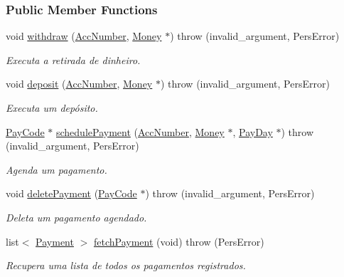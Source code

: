 \subsubsection*{Public Member Functions}
\begin{DoxyCompactItemize}
\item 
void \hyperlink{classStubTransacAdm_aa411e937e159c26aa50901aad504db42}{withdraw} (\hyperlink{classAccNumber}{Acc\-Number}, \hyperlink{classMoney}{Money} $\ast$)  throw (invalid\-\_\-argument, Pers\-Error)
\begin{DoxyCompactList}\small\item\em Executa a retirada de dinheiro. \end{DoxyCompactList}\item 
void \hyperlink{classStubTransacAdm_afc25824382e5ce8cd491a573b557bbc1}{deposit} (\hyperlink{classAccNumber}{Acc\-Number}, \hyperlink{classMoney}{Money} $\ast$)  throw (invalid\-\_\-argument, Pers\-Error)
\begin{DoxyCompactList}\small\item\em Executa um depósito. \end{DoxyCompactList}\item 
\hyperlink{classPayCode}{Pay\-Code} $\ast$ \hyperlink{classStubTransacAdm_ad794a9d6f46b1f4d62aef292f8fed5f4}{schedule\-Payment} (\hyperlink{classAccNumber}{Acc\-Number}, \hyperlink{classMoney}{Money} $\ast$, \hyperlink{classPayDay}{Pay\-Day} $\ast$)  throw (invalid\-\_\-argument, Pers\-Error)
\begin{DoxyCompactList}\small\item\em Agenda um pagamento. \end{DoxyCompactList}\item 
void \hyperlink{classStubTransacAdm_a734de9620871592c6d40b2c819c69650}{delete\-Payment} (\hyperlink{classPayCode}{Pay\-Code} $\ast$)  throw (invalid\-\_\-argument, Pers\-Error)
\begin{DoxyCompactList}\small\item\em Deleta um pagamento agendado. \end{DoxyCompactList}\item 
list$<$ \hyperlink{classPayment}{Payment} $>$ \hyperlink{classStubTransacAdm_a0896f821752fc696322bd58444a1d5ab}{fetch\-Payment} (void)  throw (\-Pers\-Error)
\begin{DoxyCompactList}\small\item\em Recupera uma lista de todos os pagamentos registrados. \end{DoxyCompactList}\end{DoxyCompactItemize}


